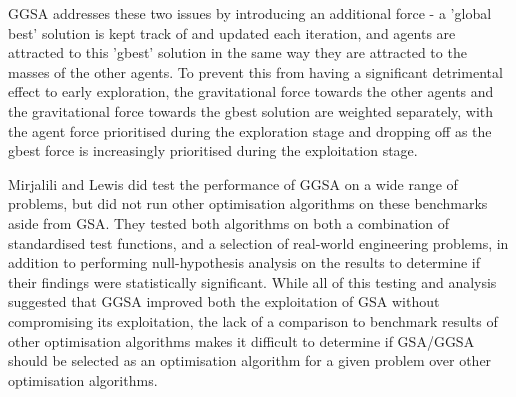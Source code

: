 GGSA addresses these two issues by introducing an additional force - a 'global best' solution is kept track of and updated each iteration, and agents are attracted to this 'gbest' solution in the same way they are attracted to the masses of the other agents.
To prevent this from having a significant detrimental effect to early exploration, the gravitational force towards the other agents and the gravitational force towards the gbest solution are weighted separately, with the agent force prioritised during the exploration stage and dropping off as the gbest force is increasingly prioritised during the exploitation stage.

Mirjalili and Lewis \cite{GGSA} did test the performance of GGSA on a wide range of problems, but did not run other optimisation algorithms on these benchmarks aside from GSA.
They tested both algorithms on both a combination of standardised test functions, and a selection of real-world engineering problems, in addition to performing null-hypothesis analysis on the results to determine if their findings were statistically significant.
While all of this testing and analysis suggested that GGSA improved both the exploitation of GSA without compromising its exploitation, the lack of a comparison to benchmark results of other optimisation algorithms makes it difficult to determine if GSA/GGSA should be selected as an optimisation algorithm for a given problem over other optimisation algorithms.
